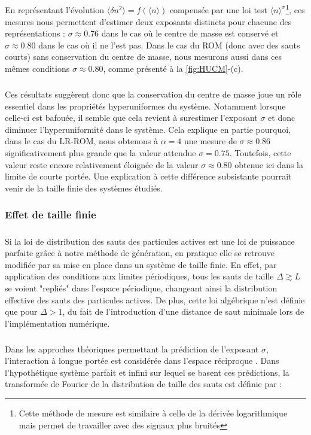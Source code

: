 \subparagraph{}En représentant l'évolution $\langle \delta n^2 \rangle = f(\langle n \rangle)$ compensée par une loi test $\langle n \rangle^\sigma$\footnote{Cette méthode de mesure est similaire à celle de la dérivée logarithmique mais permet de travailler avec des signaux plus bruités}, ces mesures nous permettent d'estimer deux exposants distincts pour chacune des représentations : $\sigma \approx 0.76$ dans le cas où le centre de masse est conservé et $\sigma\approx 0.80$ dans le cas où il ne l'est pas. Dans le cas du ROM (donc avec des sauts courts) sans conservation du centre de masse, nous mesurons aussi dans ces mêmes conditions $\sigma\approx 0.80$, comme présenté à la \autoref{fig:HUCM}-(c).

\subparagraph{}Ces résultats suggèrent donc que la conservation du centre de masse joue un rôle essentiel dans les propriétés hyperuniformes du système. Notamment lorsque celle-ci est bafouée, il semble que cela revient à surestimer l'exposant $\sigma$ et donc diminuer l'hyperuniformité dans le système. Cela explique en partie pourquoi, dans le cas du LR-ROM, nous obtenons à $\alpha = 4$ une mesure de $\sigma\approx 0.86$ significativement plus grande que la valeur attendue $\sigma= 0.75$. Toutefois, cette valeur reste encore relativement éloignée de la valeur $\sigma\approx 0.80$ obtenue ici dans la limite de courte portée. Une explication à cette différence subsistante pourrait venir de la taille finie des systèmes étudiés.

\subsubsection{Effet de taille finie}

\subparagraph{}Si la loi de distribution des sauts des particules actives est une loi de puissance parfaite grâce à notre méthode de génération, en pratique elle se retrouve modifiée par sa mise en place dans un système de taille finie. En effet, par application des conditions aux limites périodiques, tous les sauts de taille $\Delta \gtrsim L$ se voient "repliés" dans l'espace périodique, changeant ainsi la distribution effective des sauts des particules actives. De plus, cette loi algébrique n'est définie que pour $\Delta>1$, du fait de l'introduction d'une distance de saut minimale lors de l'implémentation numérique.

\subparagraph{}Dans les approches théoriques permettant la prédiction de l'exposant $\sigma$, l'interaction à longue portée est considérée dans l'espace réciproque \cite{wiese_longrange}. Dans l'hypothétique système parfait et infini sur lequel se basent ces prédictions, la transformée de Fourier de la distribution de taille des sauts est définie par :

